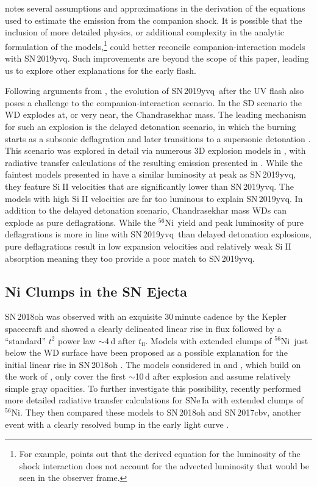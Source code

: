 \documentclass[twocolumn]{aastex63}
\def\ion#1#2{#1$\;${\footnotesize\rm{#2}}\relax}
\newcommand{\tfl}{$t_\mathrm{fl}$}
\newcommand{\radni}{$^{56}$Ni}
\newcommand{\sn}{SN\,2019yvq}
\begin{document}
\citet{Kasen10a} notes several assumptions and approximations in the
derivation of the equations used to estimate the emission from the companion
shock. It is possible that the inclusion of more detailed physics, or
additional complexity in the analytic formulation of the models,\footnote{For
example, \citet{Kasen10a} points out that the derived equation for the
luminosity of the shock interaction does not account for the advected
luminosity that would be seen in the observer frame.} could better reconcile
companion-interaction models with \sn. Such improvements are beyond the scope
of this paper, leading us to explore other explanations for the early flash.

Following arguments from \citet{Kromer16}, the evolution of \sn\ after the UV
flash also poses a challenge to the companion-interaction scenario. In the SD
scenario the WD explodes at, or very near, the Chandrasekhar mass. The leading
mechanism for such an explosion is the delayed detonation scenario, in which
the burning starts as a subsonic deflagration and later transitions to a
supersonic detonation \citep{Khokhlov91}. This scenario was explored in detail
via numerous 3D explosion models in \citet{Seitenzahl13}, with radiative
transfer calculations of the resulting emission presented in \citet{Sim13}.
While the faintest models presented in \citet{Sim13} have a similar luminosity
at peak as \sn, they feature \ion{Si}{II} velocities that are significantly
lower than \sn. The \citeauthor{Sim13} models with high \ion{Si}{II}
velocities are far too luminous to explain \sn. In addition to the delayed
detonation scenario, Chandrasekhar mass WDs can explode as pure deflagrations.
While the \radni\ yield and peak luminosity of pure deflagrations is more in
line with \sn\ than delayed detonation explosions, pure deflagrations result
in low expansion velocities and relatively weak \ion{Si}{II} absorption
\citep[e.g.,][]{Fink14} meaning they too provide a poor match to \sn.

\subsection{Ni Clumps in the SN Ejecta}

SN\,2018oh was observed with an exquisite 30\,minute cadence by the Kepler
spacecraft and showed a clearly delineated linear rise in flux followed by a
``standard'' $t^2$ power law $\sim$4\,d after \tfl. Models with extended
clumps of \radni\ just below the WD surface have been proposed as a possible
explanation for the initial linear rise in SN\,2018oh \citep{Dimitriadis19,
Shappee19}. The models considered in \citet{Shappee19} and
\citet{Dimitriadis19}, which build on the work of \citet{Piro16}, only cover
the first $\sim$10\,d after explosion and assume relatively simple gray
opacities. To further investigate this possibility, \citet{Magee20a} recently
performed more detailed radiative transfer calculations for SNe\,Ia with
extended clumps of \radni. They then compared these models to SN\,2018oh and
SN\,2017cbv, another event with a clearly resolved bump in the early light
curve \citep{Hosseinzadeh17}.
\end{document}
